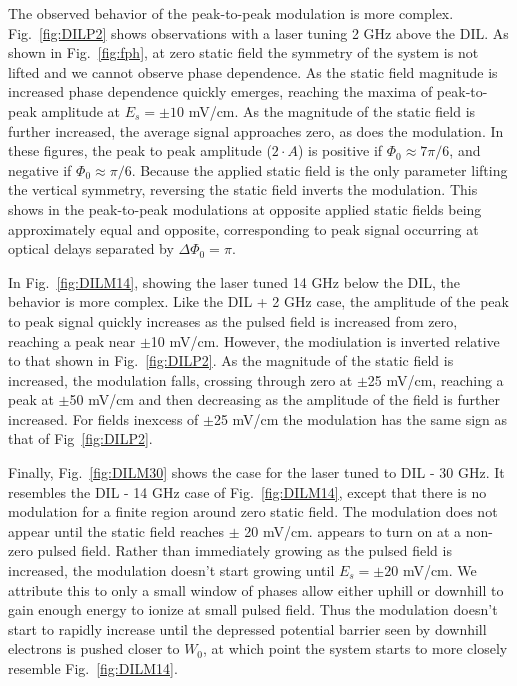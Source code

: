 \documentclass[aps,pra,preprint,groupedaddress]{revtex4-1}
\begin{document}
The observed behavior of the peak-to-peak modulation is more complex. Fig.~\ref{fig:DILP2} shows observations with a laser tuning 2 GHz above the DIL. As shown in Fig.~\ref{fig:fph}, at zero static field the symmetry of the system is not lifted and we cannot observe phase dependence. As the static field magnitude is increased phase dependence quickly emerges, reaching the maxima of peak-to-peak amplitude at $E_s = \pm 10$ mV/cm. As the magnitude of the static field is further increased, the average signal approaches zero, as does the modulation. In these figures, the peak to peak amplitude ($2 \cdot A$) is positive if $\Phi_0 \approx 7\pi/6$, and negative if $\Phi_0 \approx \pi/6$. Because the applied static field is the only parameter lifting the vertical symmetry, reversing the static field inverts the modulation. This shows in the peak-to-peak modulations at opposite applied static fields being approximately equal and opposite, corresponding to peak signal occurring at optical delays separated by $\Delta \Phi_0 = \pi$.

In Fig.~\ref{fig:DILM14}, showing the laser tuned 14 GHz below the DIL, the behavior is more complex. Like the DIL + 2 GHz case, the amplitude of the peak to peak signal quickly increases as the pulsed field is increased from zero, reaching a peak near $\pm$10 mV/cm. However, the modiulation is inverted relative to that shown in Fig.~\ref{fig:DILP2}. As the magnitude of the static field is increased, the modulation falls, crossing through zero at $\pm$25 mV/cm, reaching a peak at $\pm$50 mV/cm and then decreasing as the amplitude of the field is further increased. For fields inexcess of $\pm$25 mV/cm the modulation has the same sign as that of Fig~\ref{fig:DILP2}.

Finally, Fig.~\ref{fig:DILM30} shows the case for the laser tuned to DIL - 30 GHz. It resembles the DIL - 14 GHz case of Fig.~\ref{fig:DILM14}, except that there is no modulation for a finite region around zero static field. The modulation does not appear until the static field reaches $\pm$ 20 mV/cm. appears to turn on at a non-zero pulsed field. Rather than immediately growing as the pulsed field is increased, the modulation doesn't start growing until $E_s = \pm 20$ mV/cm. We attribute this to only a small window of phases allow either uphill or downhill to gain enough energy to ionize at small pulsed field. Thus the modulation doesn't start to rapidly increase until the depressed potential barrier seen by downhill electrons is pushed closer to $W_0$, at which point the system starts to more closely resemble Fig.~\ref{fig:DILM14}.
\end{document}
